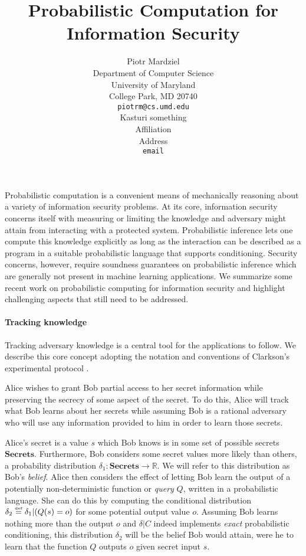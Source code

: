 \documentclass{article} %
\title{Probabilistic Computation for Information Security}
\author{
Piotr Mardziel\\
Department of Computer Science\\
University of Maryland\\
College Park, MD 20740 \\
\texttt{piotrm@cs.umd.edu} \\
\And
Kasturi something \\
Affiliation \\
Address \\
\texttt{email} \\
}
\newcommand{\ra}{\rightarrow}
\newcommand{\Real}{\mathbb{R}}
\newcommand{\secrets}[0]{\textbf{Secrets}}
\newcommand{\cond}[0]{|}
\newcommand{\stacklabel}[1]{\stackrel{\smash{\scriptscriptstyle \mathrm{#1}}}}
\newcommand{\defeq}{\stacklabel{def}=}
\theoremstyle{plain} %
\theoremstyle{definition} %
\begin{document}
\maketitle

Probabilistic computation is a convenient means of mechanically
reasoning about a variety of information security problems. At its
core, information security concerns itself with measuring or limiting
the knowledge and adversary might attain from interacting with a
protected system. Probabilistic inference lets one compute this
knowledge explicitly as long as the interaction can be described as a
program in a suitable probabilistic language that supports
conditioning. Security concerns, however, require soundness guarantees
on probabilistic inference which are generally not present in machine
learning applications. We summarize some recent work on probabilistic
computing for information security and highlight challenging aspects
that still need to be addressed.

\paragraph*{Tracking knowledge}

Tracking adversary knowledge is a central tool for the applications to
follow. We describe this core concept adopting the notation and
conventions of Clarkson's experimental protocol
\cite{clarkson09quantifying}.

Alice wishes to grant Bob partial access to her secret information
while preserving the secrecy of some aspect of the secret. To do this,
Alice will track what Bob learns about her secrets while assuming Bob
is a rational adversary who will use any information provided to him
in order to learn those secrets.

Alice's secret is a value $ s $ which Bob knows is in some set of
possible secrets $ \secrets $. Furthermore, Bob considers some secret
values more likely than others, a probability distribution $ \delta_1
: \secrets \ra \Real $. We will refer to this distribution as Bob's
\emph{belief}. Alice then considers the effect of letting Bob learn
the output of a potentially non-deterministic function or \emph{query}
$ Q $, written in a probabilistic language. She can do this by
computing the conditional distribution $ \delta_2 \defeq \delta_1
\cond (Q(s) = o) $ for some potential output value $ o $. Assuming Bob
learns nothing more than the output $ o $ and $ \delta | C $ indeed
implements \emph{exact} probabilistic conditioning, this distribution
$ \delta_2 $ will be the belief Bob would attain, were he to learn
that the function $ Q $ outputs $ o $ given secret input $ s $.
\end{document}
